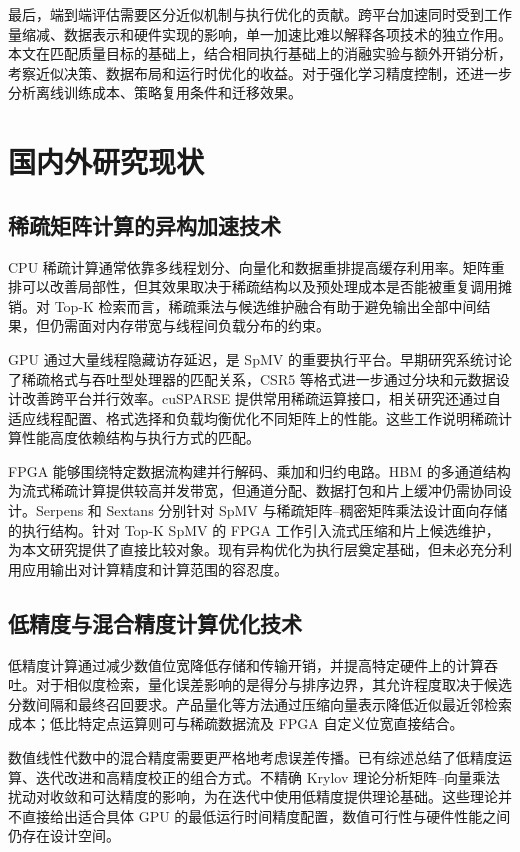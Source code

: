 最后，端到端评估需要区分近似机制与执行优化的贡献。跨平台加速同时受到工作量缩减、数据表示和硬件实现的影响，单一加速比难以解释各项技术的独立作用。本文在匹配质量目标的基础上，结合相同执行基础上的消融实验与额外开销分析，考察近似决策、数据布局和运行时优化的收益。对于强化学习精度控制，还进一步分析离线训练成本、策略复用条件和迁移效果。

\section{国内外研究现状}
\subsection{稀疏矩阵计算的异构加速技术}
CPU 稀疏计算通常依靠多线程划分、向量化和数据重排提高缓存利用率。矩阵重排可以改善局部性，但其效果取决于稀疏结构以及预处理成本是否能被重复调用摊销\cite{trotter2023bringing}。对 Top-K 检索而言，稀疏乘法与候选维护融合有助于避免输出全部中间结果，但仍需面对内存带宽与线程间负载分布的约束。

GPU 通过大量线程隐藏访存延迟，是 SpMV 的重要执行平台。早期研究系统讨论了稀疏格式与吞吐型处理器的匹配关系\cite{bell2009}，CSR5 等格式进一步通过分块和元数据设计改善跨平台并行效率\cite{csr5_2015}。cuSPARSE 提供常用稀疏运算接口\cite{cusparse_2010}，相关研究还通过自适应线程配置、格式选择和负载均衡优化不同矩阵上的性能\cite{adaptive_2020,gao2024revisiting,anzt2020load}。这些工作说明稀疏计算性能高度依赖结构与执行方式的匹配。

FPGA 能够围绕特定数据流构建并行解码、乘加和归约电路。HBM 的多通道结构为流式稀疏计算提供较高并发带宽，但通道分配、数据打包和片上缓冲仍需协同设计\cite{shuhai_2020}。Serpens 和 Sextans 分别针对 SpMV 与稀疏矩阵--稠密矩阵乘法设计面向存储的执行结构\cite{serpens_2022,sextans_2022}。针对 Top-K SpMV 的 FPGA 工作引入流式压缩和片上候选维护\cite{scaling_2021}，为本文研究提供了直接比较对象。现有异构优化为执行层奠定基础，但未必充分利用应用输出对计算精度和计算范围的容忍度。

\subsection{低精度与混合精度计算优化技术}
低精度计算通过减少数值位宽降低存储和传输开销，并提高特定硬件上的计算吞吐。对于相似度检索，量化误差影响的是得分与排序边界，其允许程度取决于候选分数间隔和最终召回要求。产品量化等方法通过压缩向量表示降低近似最近邻检索成本\cite{jegou2010product}；低比特定点运算则可与稀疏数据流及 FPGA 自定义位宽直接结合。

数值线性代数中的混合精度需要更严格地考虑误差传播。已有综述总结了低精度运算、迭代改进和高精度校正的组合方式\cite{abdelfattah2021,higham2022}。不精确 Krylov 理论分析矩阵--向量乘法扰动对收敛和可达精度的影响，为在迭代中使用低精度提供理论基础\cite{simoncini2003,bouras2005,eshof2004}。这些理论并不直接给出适合具体 GPU 的最低运行时间精度配置，数值可行性与硬件性能之间仍存在设计空间。

